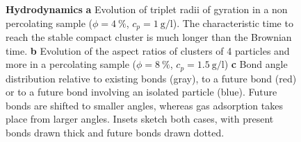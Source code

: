 \begin{figure}
	\caption{\textbf{Hydrodynamics} \textbf{a} Evolution of triplet radii of gyration in a non percolating sample ($\phi=4~\%$, $c_p=\SI{1}{\gram\per\litre}$). The characteristic time to reach the stable compact cluster is much longer than the Brownian time. \textbf{b} Evolution of the aspect ratios of clusters of 4 particles and more in a percolating sample ($\phi=8~\%$, $c_p=\SI{1.5}{\gram\per\litre}$) \textbf{c} Bond angle distribution relative to existing bonds (gray), to a future bond (red) or to a future bond involving an isolated particle (blue). Future bonds are shifted to smaller angles, whereas gas adsorption takes place from larger angles. Insets sketch both cases, with present bonds drawn thick and future bonds drawn dotted.}
	\label{fig:hydro}
\end{figure}





